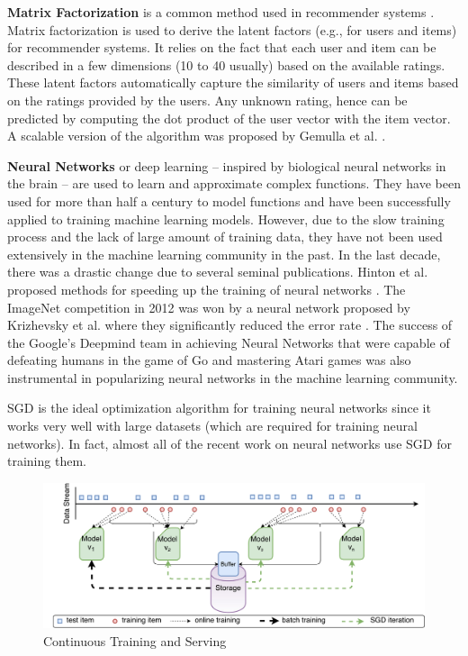 \documentclass{vldb}
\begin{document}
\textbf{Matrix Factorization} is a common method used in recommender systems \cite{koren2009matrix}. 
Matrix factorization is used to derive the latent factors (e.g., for users and items) for recommender systems.
It relies on the fact that each user and item can be described in a few dimensions (10 to 40 usually) based on the available ratings.
These latent factors automatically capture the similarity of users and items based on the ratings provided by the users.
Any unknown rating, hence can be predicted by computing the dot product of the user vector with the item vector.
A scalable version of the algorithm was proposed by Gemulla et al. \cite{gemulla2011large}.

\textbf{Neural Networks} or deep learning -- inspired by biological neural networks in the brain -- are used to learn and approximate complex functions. 
They have been used for more than half a century to model functions and have been successfully applied to training machine learning models.
However, due to the slow training process and the lack of large amount of training data, they have not been used extensively in the machine learning community in the past.
In the last decade, there was a drastic change due to several seminal publications.
Hinton et al. proposed methods for speeding up the training of neural networks \cite{hinton2006fast}.
The ImageNet competition \cite{ILSVRC15} in 2012 was won by a neural network proposed by Krizhevsky et al. where they significantly reduced the error rate \cite{krizhevsky2012imagenet}. 
The success of the Google's Deepmind team in achieving Neural Networks that were capable of defeating humans in the game of Go \cite{silver2016mastering} and mastering Atari games \cite{mnih2013playing} was also instrumental in popularizing neural networks in the machine learning community.

SGD is the ideal optimization algorithm for training neural networks since it works very well with large datasets (which are required for training neural networks).
In fact, almost all of the recent work on neural networks use SGD for training them.

\begin{figure}[t]
\centering
\includegraphics[width=.6\textwidth]{../images/continuous-1.pdf}
\caption{Continuous Training and Serving}
\label{fig:cont-training-serving}
\end{figure}
\end{document}
